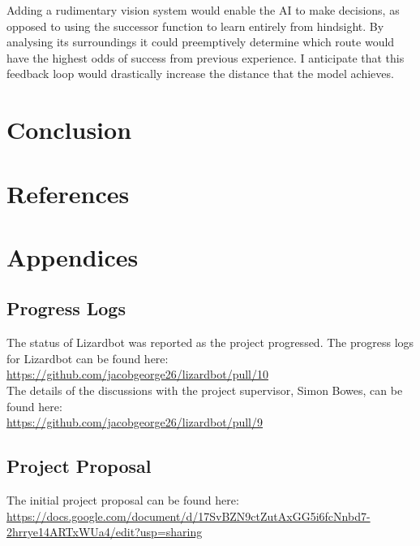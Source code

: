 \documentclass{article}
\begin{document}
Adding a rudimentary vision system would enable the AI to make decisions, as opposed to using the successor function to learn entirely from hindsight. By analysing its surroundings it could preemptively determine which route would have the highest odds of success from previous experience. I anticipate that this feedback loop would drastically increase the distance that the model achieves. 



\newpage
\section{Conclusion}

\newpage

\section{References}

\newpage


\section{Appendices}
\subsection{Progress Logs}
The status of Lizardbot was reported as the project progressed.
The progress logs for Lizardbot can be found here:\\
\url{https://github.com/jacobgeorge26/lizardbot/pull/10}\\

\noindent The details of the discussions with the project supervisor, Simon Bowes, can be found here:\\
\url{https://github.com/jacobgeorge26/lizardbot/pull/9}


\subsection{Project Proposal}
The initial project proposal can be found here:\\
\url{https://docs.google.com/document/d/17SvBZN9ctZutAxGG5i6fcNnbd7-2hrrye14ARTxWUa4/edit?usp=sharing}
\end{document}
